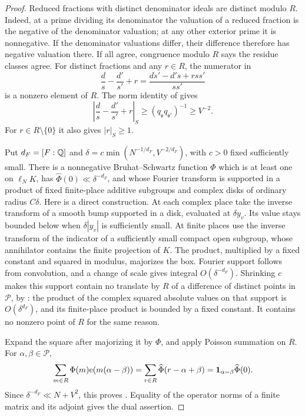 \begin{proof}
Reduced fractions with distinct denominator ideals are distinct modulo
\(R\).  Indeed, at a prime dividing its denominator the valuation of a
reduced fraction is the negative of the denominator valuation; at any
other exterior prime it is nonnegative.  If the denominator valuations
differ, their difference therefore has negative valuation there.
If all agree, congruence modulo \(R\) says the residue classes agree.
For distinct fractions and any \(r\in R\), the numerator in
\[
 \frac d s-\frac {d'}{s'}+r
       =\frac{ds'-d's+rss'}{ss'}
\]
is a nonzero element of \(R\).  The norm identity of
 gives
\begin{equation}
 \left|\frac d s-\frac {d'}{s'}+r\right|_S
       \ge (q_{\mathfrak s}q_{\mathfrak s'})^{-1}\ge V^{-2}.
\label{eq:additive-separation}
\end{equation}
For \(r\in R\setminus\{0\}\) it also gives \(|r|_S\ge1\).

Put \(d_F=[F:\mathbb{Q}]\) and
\(\delta=c\min(N^{-1/d_F},V^{-2/d_F})\), with \(c>0\) fixed sufficiently
small.  There is a nonnegative Bruhat--Schwartz function \(\Phi\) which is
at least one on \(\ell_NK\), has
\(\widehat\Phi(0)\ll\delta^{-d_F}\), and whose Fourier transform is supported
in a product of fixed finite-place additive subgroups and complex disks
of ordinary radius \(C\delta\).  Here is a direct construction.  At each
complex place take the inverse transform of a smooth bump
supported in a disk, evaluated at \(\delta y_v\).  Its value stays
bounded below when \(\delta|y_v|\) is sufficiently small.  At finite
places use the inverse transform of the indicator of a sufficiently
small compact open subgroup, whose annihilator contains the finite
projection of \(K\).  The product, multiplied by a fixed constant and
squared in modulus, majorizes the box.  Fourier support follows from
convolution, and a change of scale gives integral \(O(\delta^{-d_F})\).
Shrinking \(c\) makes this support contain no translate by \(R\) of a
difference of distinct points in \(\mathcal P\), by
: the product of the complex squared absolute
values on that support is \(O(\delta^{d_F})\), and its finite-place product
is bounded by a fixed constant.  It contains no nonzero point of \(R\)
for the same reason.

Expand the square after majorizing it by \(\Phi\), and apply Poisson
summation on \(R\).  For \(\alpha,\beta\in\mathcal P\),
\[
 \sum_{m\in R}\Phi(m)\mathrm{e}(m(\alpha-\beta))
   =\sum_{r\in R}\widehat\Phi(r-\alpha+\beta)
   =\mathbf{1}_{\alpha=\beta}\widehat\Phi(0).
\]
Since \(\delta^{-d_F}\ll N+V^2\), this proves
.  Equality of the operator norms of a finite
matrix and its adjoint gives the dual assertion.
\end{proof}

